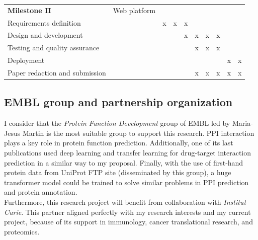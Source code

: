\documentclass[a4paper,11pt]{article}
\begin{document}
\begin{table}[H]
{\begin{tabular}{|p{7.4cm}|p{2.3cm}|c|c|c|c|c|c|c|c|}
			\textbf{Milestone II} & Web platform & & & & & & & & \\
			Requirements definition &  &     x                &    x                    &            x             &                       &                      &                       &                               &                   \\
			Design and development &  &                     &                        &                 x        & x                      & x                     & x                      &                               &                   \\
			Testing and quality assurance &  &                     &                        &                         & x                      & x                     & x                      &                               &                   \\
			Deployment  &                                      &                       &                        &                         &                        &                      &                       & x                                         & x    \\
			Paper redaction and submission    &                              &                       &                        &                         &              x         &             x         &                x       & x                                       & x     \\ \hline
		\end{tabular}
	}
\end{table}

\subsection{EMBL group and partnership organization}
I consider that the \textit{Protein Function Development} group of EMBL led by Maria-Jesus Martin is the most suitable group to support this research. PPI interaction plays a key role in protein function prediction. Additionally, one of its last publications \cite{dalkiran2023transfer} used deep learning and transfer learning for drug-target interaction prediction in a similar way to my proposal. Finally, with the use of first-hand protein data from UniProt FTP site (disseminated by this group), a huge transformer model could be trained to solve similar problems in PPI prediction and protein annotation.\\

Furthermore, this research project will benefit from collaboration with 
\textit{Institut Curie}. This partner aligned perfectly with my research interests and my current project, because of its support in immunology, cancer translational research, and proteomics.
\end{document}
